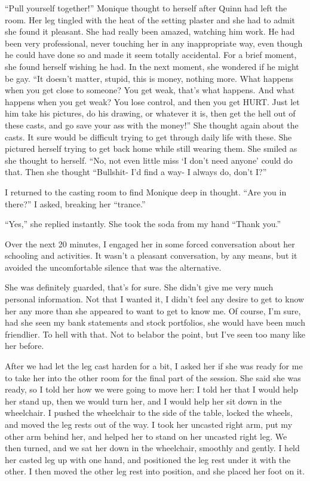 \begin{thought}
    ``Pull yourself together!'' Monique thought to herself after Quinn had left the room. Her
leg tingled with the heat of the setting plaster and she had to admit she found it pleasant. She
had really been amazed, watching him work. He had been very professional, never touching her in
any inappropriate way, even though he could have done so and made it seem totally accidental.
For a brief moment, she found herself wishing he had. In the next moment, she wondered if he
might be gay. ``It doesn't matter, stupid, this is money, nothing more. What happens when you
get close to someone? You get weak, that's what happens. And what happens when you get weak? You
lose control, and then you get HURT. Just let him take his pictures, do his drawing, or whatever
it is, then get the hell out of these casts, and go save your ass with the money!'' She thought
again about the casts. It sure would be difficult trying to get through daily life with these.
She pictured herself trying to get back home while still wearing them. She smiled as she thought
to herself. ``No, not even little miss ‘I don't need anyone' could do that. Then she thought
``Bullshit- I'd find a way- I always do, don't I?''
\end{thought}

    I returned to the casting room to find Monique deep in thought. ``Are you in there?'' I
asked, breaking her ``trance.''

    ``Yes,'' she replied instantly. She took the soda from my hand ``Thank you.''

    Over the next 20 minutes, I engaged her in some forced conversation about her schooling and
activities. It wasn't a pleasant conversation, by any means, but it avoided the uncomfortable
silence that was the alternative.

    She was definitely guarded, that's for sure. She didn't give me very much personal
information. Not that I wanted it, I didn't feel any desire to get to know her any more than she
appeared to want to get to know me. Of course, I'm sure, had she seen my bank statements and
stock portfolios, she would have been much friendlier. To hell with that. Not to belabor the
point, but I've seen too many like her before.

    After we had let the leg cast harden for a bit, I asked her if she was ready for me to take
her into the other room for the final part of the session. She said she was ready, so I told her
how we were going to move her: I told her that I would help her stand up, then we would turn
her, and I would help her sit down in the wheelchair. I pushed the wheelchair to the side of the
table, locked the wheels, and moved the leg rests out of the way. I took her uncasted right arm,
put my other arm behind her, and helped her to stand on her uncasted right leg. We then turned,
and we sat her down in the wheelchair, smoothly and gently. I held her casted leg up with one
hand, and positioned the leg rest under it with the other. I then moved the other leg rest into
position, and she placed her foot on it.

